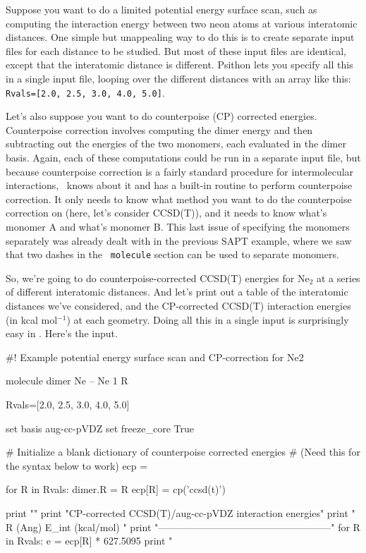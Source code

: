 Suppose you want to do a limited potential energy surface scan, such as
computing the interaction energy between two neon atoms at various
interatomic distances.  One simple but unappealing way to do this is to
create separate input files for each distance to be studied.  But most of
these input files are identical, except that the interatomic distance is
different.  Psithon lets you specify all this in a single input file,
looping over the different distances with an array like this: {\tt
Rvals=[2.0, 2.5, 3.0, 4.0, 5.0]}.

Let's also suppose you want to do counterpoise (CP) corrected energies.
Counterpoise correction involves computing the dimer energy and then
subtracting out the energies of the two monomers, each evaluated in the
dimer basis.  Again, each of these computations could be run in a separate
input file, but because counterpoise correction is a fairly standard
procedure for intermolecular interactions, \PSIfour\ knows about it and has
a built-in routine to perform counterpoise correction.  It only needs to
know what method you want to do the counterpoise correction on (here, let's
consider CCSD(T)), and it needs to know what's monomer A and what's monomer
B.  This last issue of specifying the monomers separately was already dealt
with in the previous SAPT example, where we saw that two dashes in the {\tt
molecule} section can be used to separate monomers.

So, we're going to do counterpoise-corrected CCSD(T) energies for Ne$_2$ at
a series of different interatomic distances.  And let's print out a table
of the interatomic distances we've considered, and the CP-corrected CCSD(T)
interaction energies (in kcal mol$^{-1}$) at each geometry.  Doing all this
in a single input is surprisingly easy in \PSIfour.  Here's the input.

\begin{Snippet}
#! Example potential energy surface scan and CP-correction for Ne2

molecule dimer {
  Ne
--
  Ne 1 R
}

Rvals=[2.0, 2.5, 3.0, 4.0, 5.0]

set basis aug-cc-pVDZ
set freeze_core True

# Initialize a blank dictionary of counterpoise corrected energies
# (Need this for the syntax below to work)
ecp = {}

for R in Rvals:
  dimer.R = R
  ecp[R] = cp('ccsd(t)')

print "\n"
print "CP-corrected CCSD(T)/aug-cc-pVDZ interaction energies\n\n"
print "        R (Ang)         E_int (kcal/mol)             \n"
print "-----------------------------------------------------\n"
for R in Rvals:
  e = ecp[R] * 627.5095
  print "        %
\end{Snippet}

